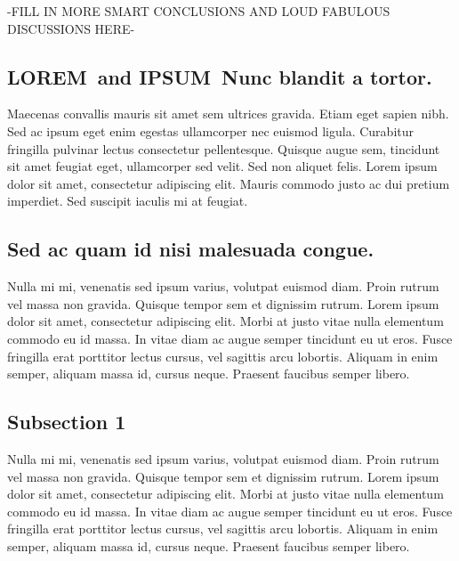 \documentclass[10pt,letterpaper]{article}
\newcommand{\lorem}{{\bf LOREM}}
\newcommand{\ipsum}{{\bf IPSUM}}
\begin{document}
-FILL IN MORE SMART CONCLUSIONS AND LOUD FABULOUS DISCUSSIONS HERE-

\subsection*{\lorem\ and \ipsum\ Nunc blandit a tortor.}

Maecenas convallis mauris sit amet sem ultrices gravida. Etiam eget sapien nibh. Sed ac ipsum eget enim egestas ullamcorper nec euismod ligula. Curabitur fringilla pulvinar lectus consectetur pellentesque. Quisque augue sem, tincidunt sit amet feugiat eget, ullamcorper sed velit. Sed non aliquet felis. Lorem ipsum dolor sit amet, consectetur adipiscing elit. Mauris commodo justo ac dui pretium imperdiet. Sed suscipit iaculis mi at feugiat. 

\subsection*{Sed ac quam id nisi malesuada congue.}

Nulla mi mi, venenatis sed ipsum varius, volutpat euismod diam. Proin rutrum vel massa non gravida. Quisque tempor sem et dignissim rutrum. Lorem ipsum dolor sit amet, consectetur adipiscing elit. Morbi at justo vitae nulla elementum commodo eu id massa. In vitae diam ac augue semper tincidunt eu ut eros. Fusce fringilla erat porttitor lectus cursus, vel sagittis arcu lobortis. Aliquam in enim semper, aliquam massa id, cursus neque. Praesent faucibus semper libero.

\subsection*{Subsection 1}
Nulla mi mi, venenatis sed ipsum varius, volutpat euismod diam. Proin rutrum vel massa non gravida. Quisque tempor sem et dignissim rutrum. Lorem ipsum dolor sit amet, consectetur adipiscing elit. Morbi at justo vitae nulla elementum commodo eu id massa. In vitae diam ac augue semper tincidunt eu ut eros. Fusce fringilla erat porttitor lectus cursus, vel sagittis arcu lobortis. Aliquam in enim semper, aliquam massa id, cursus neque. Praesent faucibus semper libero.
\end{document}
